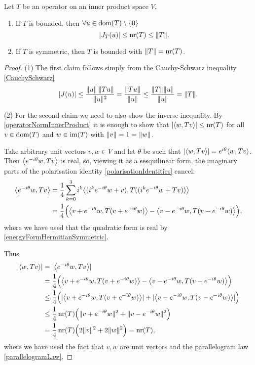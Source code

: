 \begin{proposition} \label{normNumRadius}
Let $T$ be an operator on an inner product space $V$.
\begin{enumerate}
\item If $T$ is bounded, then $\forall u\in \operatorname{dom}(T)\setminus\{0\}$
\[ |J_T(u)| \leq \operatorname{nr}(T) \leq \lVert T\rVert. \]
\item If $T$ is symmetric, then $T$ is bounded with $\lVert T\rVert = \operatorname{nr}(T)$.
\end{enumerate}
\end{proposition}
\begin{proof}
(1) The first claim follows simply from the Cauchy-Schwarz inequality \ref{CauchySchwarz}
\[ |J(u)| \leq \frac{\lVert u\rVert\,\lVert Tu\rVert}{\lVert u\rVert^2} = \frac{\lVert Tu\rVert}{\lVert u\rVert} \leq \frac{\lVert T\rVert\lVert u\rVert}{\lVert u\rVert} = \lVert T\rVert. \]

(2) For the second claim we need to also show the inverse inequality. By \ref{operatorNormInnerProduct} it is enough to show that $|\inner{w,Tv}| \leq \nr(T)$ for all $v\in \operatorname{dom}(T)$ and $w\in\operatorname{im}(T)$ with $\lVert v\rVert = 1 = \lVert w\rVert$.

Take arbitrary unit vectors $v,w\in V$ and let $\theta$ be such that $|\inner{w,Tv}| = e^{i\theta}\inner{w,Tv}$. Then $\inner{e^{-i\theta}w,Tv}$ is real, so, viewing it as a sesquilinear form, the imaginary parts of the polarisation identity \ref{polarisationIdentities} cancel:
\begin{align*}
\inner{e^{-i\theta}w,Tv} &= \frac{1}{4}\sum_{k=0}^3i^k \inner{(i^ke^{-i\theta}w + v), T((i^ke^{-i\theta}w + Tv))} \\
&= \frac{1}{4}\Big( \inner{v+e^{-i\theta}w, T(v+e^{-i\theta}w)} - \inner{v-e^{-i\theta}w, T(v-e^{-i\theta}w)} \Big),
\end{align*}
where we have used that the quadratic form is real by \ref{energyFormHermitianSymmetric}.

Thus
\begin{align*}
|\inner{w,Tv}| &= |\inner{e^{-i\theta}w,Tv}| \\
&= \frac{1}{4}\Big(\inner{v+e^{-i\theta}w, T(v+e^{-i\theta}w)} - \inner{v-e^{-i\theta}w, T(v-e^{-i\theta}w)} \Big) \\
&\leq \frac{1}{4}\Big( |\inner{v+e^{-i\theta}w, T(v+e^{-i\theta}w)}| + |\inner{v-e^{-i\theta}w, T(v-e^{-i\theta}w)}| \Big) \\
&\leq \frac{1}{4}\nr(T)\Big( \norm{v+e^{-i\theta}w}^2 + \norm{v-e^{-i\theta}w}^2 \Big) \\
&= \frac{1}{4}\nr(T)\Big( 2\norm{v}^2 + 2\norm{w}^2 \Big) = \nr(T),
\end{align*}
where we have used the fact that $v,w$ are unit vectors and the parallelogram law \ref{parallelogramLaw}.
\end{proof}
